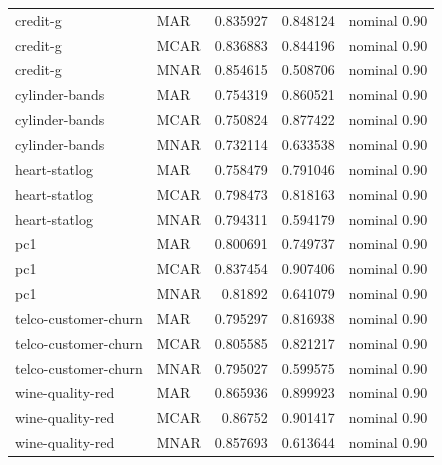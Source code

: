 \begin{table}[ht]
\begin{tabular}{llrrl}
 credit-g             & MAR         &                       0.835927 &                         0.848124 & nominal 0.90              \\
 credit-g             & MCAR        &                       0.836883 &                         0.844196 & nominal 0.90              \\
 credit-g             & MNAR        &                       0.854615 &                         0.508706 & nominal 0.90              \\
 cylinder-bands       & MAR         &                       0.754319 &                         0.860521 & nominal 0.90              \\
 cylinder-bands       & MCAR        &                       0.750824 &                         0.877422 & nominal 0.90              \\
 cylinder-bands       & MNAR        &                       0.732114 &                         0.633538 & nominal 0.90              \\
 heart-statlog        & MAR         &                       0.758479 &                         0.791046 & nominal 0.90              \\
 heart-statlog        & MCAR        &                       0.798473 &                         0.818163 & nominal 0.90              \\
 heart-statlog        & MNAR        &                       0.794311 &                         0.594179 & nominal 0.90              \\
 pc1                  & MAR         &                       0.800691 &                         0.749737 & nominal 0.90              \\
 pc1                  & MCAR        &                       0.837454 &                         0.907406 & nominal 0.90              \\
 pc1                  & MNAR        &                       0.81892  &                         0.641079 & nominal 0.90              \\
 telco-customer-churn & MAR         &                       0.795297 &                         0.816938 & nominal 0.90              \\
 telco-customer-churn & MCAR        &                       0.805585 &                         0.821217 & nominal 0.90              \\
 telco-customer-churn & MNAR        &                       0.795027 &                         0.599575 & nominal 0.90              \\
 wine-quality-red     & MAR         &                       0.865936 &                         0.899923 & nominal 0.90              \\
 wine-quality-red     & MCAR        &                       0.86752  &                         0.901417 & nominal 0.90              \\
 wine-quality-red     & MNAR        &                       0.857693 &                         0.613644 & nominal 0.90              \\
\hline
\end{tabular}
\end{table}
